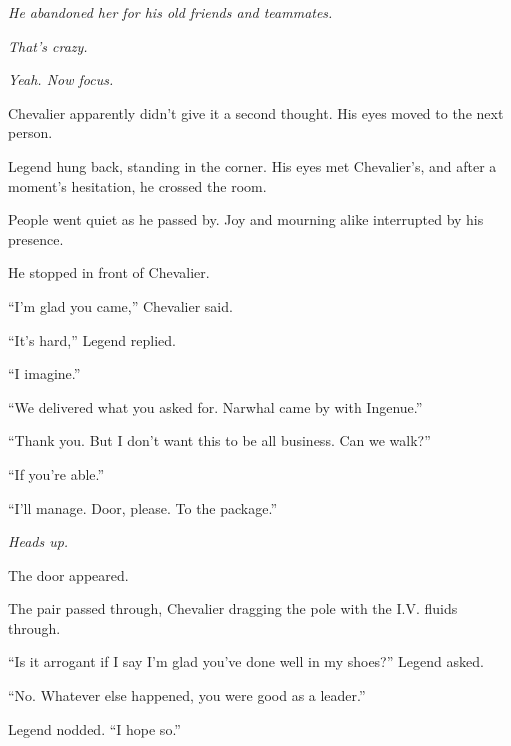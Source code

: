 \emph{He abandoned her for his old friends and teammates.}



\emph{That's crazy.}



\emph{Yeah.  Now focus.}



Chevalier apparently didn't give it a second thought.  His eyes moved to the next person.



Legend hung back, standing in the corner.  His eyes met Chevalier's, and after a moment's hesitation, he crossed the room.



People went quiet as he passed by.  Joy and mourning alike interrupted by his presence.



He stopped in front of Chevalier.



``I'm glad you came,'' Chevalier said.



``It's hard,'' Legend replied.



``I imagine.''



``We delivered what you asked for.  Narwhal came by with Ingenue.''



``Thank you.  But I don't want this to be all business.  Can we walk?''



``If you're able.''



``I'll manage.  Door, please.  To the package.''



\emph{Heads up.}



The door appeared.



The pair passed through, Chevalier dragging the pole with the I.V. fluids through.



``Is it arrogant if I say I'm glad you've done well in my shoes?'' Legend asked.



``No.  Whatever else happened, you were good as a leader.''



Legend nodded.  ``I hope so.''



